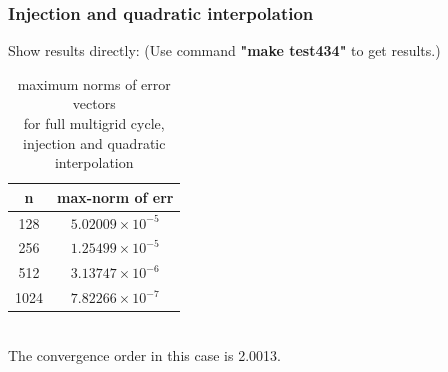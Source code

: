 \documentclass[a4paper,twocolumn]{article}
\theoremstyle{definition}
\begin{document}
\subsubsection{Injection and quadratic interpolation}
Show results directly: (Use command \textbf{"make test434"} to get results.)
\begin{table}[!htp]
	\centering
	\begin{tabular}{|c|c|}
		\hline	
		n  & max-norm of err \\
		\hline		
		128 & $5.02009\times 10^{-5}$ \\
		\hline		
		256 & $1.25499\times 10^{-5}$ \\
		\hline		
		512 & $3.13747\times 10^{-6}$ \\
		\hline		
		1024 & $7.82266\times 10^{-7}$ \\
		\hline
	\end{tabular}
	\caption{maximum norms of error vectors \\for full multigrid cycle, injection and quadratic interpolation}
\end{table}\\
The convergence order in this case is 2.0013.
\end{document}
